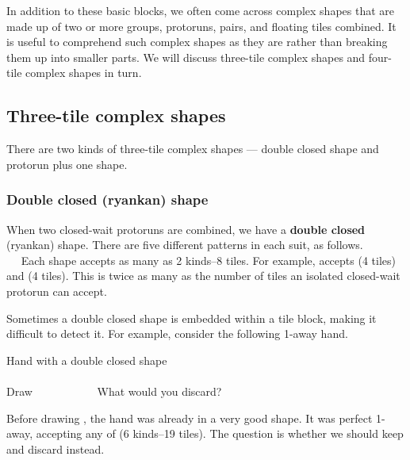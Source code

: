 {\bigskip
In addition to these basic blocks, we often come across complex shapes that are made up of two or more groups, protoruns, pairs, and floating tiles combined. It is useful to comprehend such complex shapes as they are rather than breaking them up into smaller parts. We will discuss three-tile complex shapes and four-tile complex shapes in turn. 

\subsection{Three-tile complex shapes} 

There are two kinds of three-tile complex shapes --- double closed shape and protorun plus one shape.

\vfill
\subsubsection{Double closed ({\jap ryankan}) shape} \label{sec:ryankan}
When two closed-wait protoruns are combined, we have a {\bf double closed} ({\jap ryankan}) shape. 
There are five different patterns in each suit, as follows.
\bp
{}~~~~\\
~~
\ep
Each shape accepts as many as 2 kinds--8 tiles. For example, {\LARGE{}} accepts {\LARGE{}} (4 tiles) and {\LARGE{}} (4 tiles). This is twice as many as the number of tiles an isolated closed-wait protorun can accept. 

\bigskip
Sometimes a double closed shape is embedded within a tile block, making it difficult to detect it. 
For example, consider the following 1-away hand. 
\begin{itembox}[r]{Hand with a double closed shape}
\vspace{-5pt}
\bp
{}\\ \vspace{-16pt}
\rfw{}~\\
\hfill\footnotesize{Draw~~~~~~~~~~~}
\ep
\vspace{-15pt}What would you discard? \vspace{-5pt}
\end{itembox}
\noindent
Before drawing {\LARGE{}}, the hand was already in a very good shape. It was perfect 1-away, accepting any of {\LARGE{}} (6 kinds--19 tiles). The question is whether we should keep {\LARGE{}} and discard {\LARGE{}} instead. 

}
